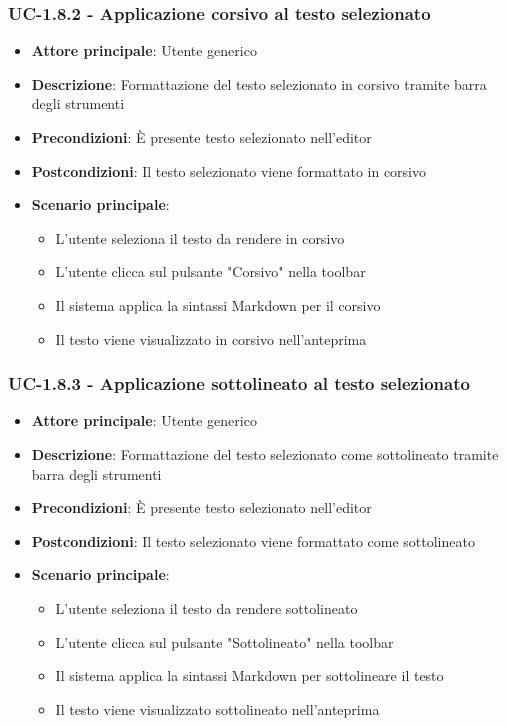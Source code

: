 \documentclass[11pt,a4paper]{article}
\begin{document}
\subsubsection{UC-1.8.2 - Applicazione corsivo al testo selezionato}
\begin{itemize}
    \item \textbf{Attore principale}: Utente generico
    \item \textbf{Descrizione}: Formattazione del testo selezionato in corsivo tramite barra degli strumenti
    \item \textbf{Precondizioni}: È presente testo selezionato nell'editor
    \item \textbf{Postcondizioni}: Il testo selezionato viene formattato in corsivo
    \item \textbf{Scenario principale}:
        \begin{itemize}
            \item L'utente seleziona il testo da rendere in corsivo
            \item L'utente clicca sul pulsante "Corsivo" nella toolbar
            \item Il sistema applica la sintassi Markdown per il corsivo
            \item Il testo viene visualizzato in corsivo nell'anteprima
        \end{itemize}
\end{itemize}

\subsubsection{UC-1.8.3 - Applicazione sottolineato al testo selezionato}
\begin{itemize}
    \item \textbf{Attore principale}: Utente generico
    \item \textbf{Descrizione}: Formattazione del testo selezionato come sottolineato tramite barra degli strumenti
    \item \textbf{Precondizioni}: È presente testo selezionato nell'editor
    \item \textbf{Postcondizioni}: Il testo selezionato viene formattato come sottolineato
    \item \textbf{Scenario principale}:
        \begin{itemize}
            \item L'utente seleziona il testo da rendere sottolineato
            \item L'utente clicca sul pulsante "Sottolineato" nella toolbar
            \item Il sistema applica la sintassi Markdown per sottolineare il testo
            \item Il testo viene visualizzato sottolineato nell'anteprima
        \end{itemize}
\end{itemize}
\end{document}

